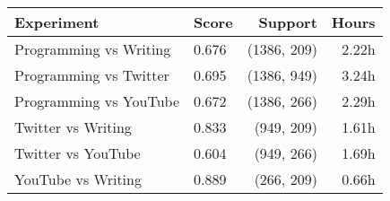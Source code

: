 \begin{tabular}{llrr}
    \toprule
    \textbf{Experiment} & \textbf{Score} & \textbf{Support} & \textbf{Hours} \\
    \midrule
    Programming vs Writing & 0.676 & (1386, 209) & 2.22h \\
    Programming vs Twitter & 0.695 &  (1386, 949) & 3.24h \\
    Programming vs YouTube & 0.672 &  (1386, 266) & 2.29h \\
    Twitter vs Writing & 0.833 &  (949, 209) & 1.61h \\
    Twitter vs YouTube & 0.604 & (949, 266) & 1.69h \\
    YouTube vs Writing & 0.889 &  (266, 209) & 0.66h \\
    \bottomrule
\end{tabular}
